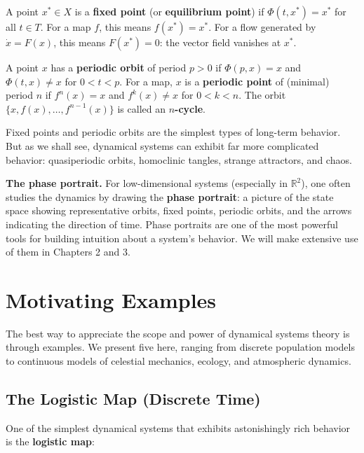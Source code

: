 \begin{definition}\label{def:1.3}
A point $x^* \in X$ is a \textbf{fixed point} (or \textbf{equilibrium point}) if $\Phi(t, x^*) = x^*$ for all $t \in T$. For a map $f$, this means $f(x^*) = x^*$. For a flow generated by $\dot{x} = F(x)$, this means $F(x^*) = 0$: the vector field vanishes at $x^*$.
\end{definition}


\begin{definition}\label{def:1.4}
A point $x$ has a \textbf{periodic orbit} of period $p > 0$ if $\Phi(p, x) = x$ and $\Phi(t, x) \neq x$ for $0 < t < p$. For a map, $x$ is a \textbf{periodic point} of (minimal) period $n$ if $f^n(x) = x$ and $f^k(x) \neq x$ for $0 < k < n$. The orbit $\{x, f(x), \ldots, f^{n-1}(x)\}$ is called an \textbf{$n$-cycle}.

Fixed points and periodic orbits are the simplest types of long-term behavior. But as we shall see, dynamical systems can exhibit far more complicated behavior: quasiperiodic orbits, homoclinic tangles, strange attractors, and chaos.

\textbf{The phase portrait.} For low-dimensional systems (especially in $\mathbb{R}^2$), one often studies the dynamics by drawing the \textbf{phase portrait}: a picture of the state space showing representative orbits, fixed points, periodic orbits, and the arrows indicating the direction of time. Phase portraits are one of the most powerful tools for building intuition about a system's behavior. We will make extensive use of them in Chapters 2 and 3.
\end{definition}


\section{Motivating Examples}\label{sec:1.4}

The best way to appreciate the scope and power of dynamical systems theory is through examples. We present five here, ranging from discrete population models to continuous models of celestial mechanics, ecology, and atmospheric dynamics.

\subsection{The Logistic Map (Discrete Time)}\label{sec:1.4.1}

One of the simplest dynamical systems that exhibits astonishingly rich behavior is the \textbf{logistic map}:

